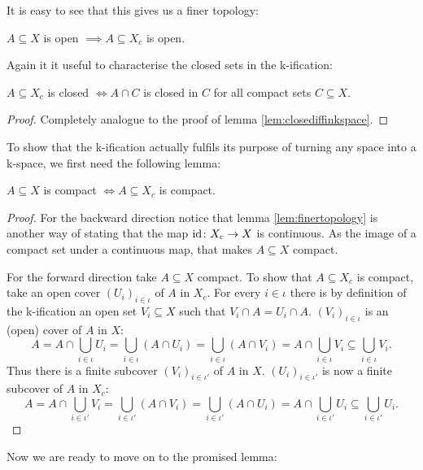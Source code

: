 It is easy to see that this gives us a finer topology: 

\begin{lem}\label{lem:finertopology}
    $A \subseteq X$ is open $\implies A \subseteq X_c$ is open.
\end{lem}

Again it it useful to characterise the closed sets in the k-ification: 

\begin{lem}
    $A \subseteq X_c$ is closed $\iff A \cap C$ is closed in $C$ for all compact sets $C \subseteq X$.
\end{lem}
\begin{proof}
    Completely analogue to the proof of lemma \ref{lem:closediffinkspace}.
\end{proof}

To show that the k-ification actually fulfils its purpose of turning any space into a k-space, we first need the following lemma:

\begin{lem}\label{lem:compactiffcompact}
    $A \subseteq X$ is compact $\iff A \subseteq X_c$ is compact.
\end{lem}
\begin{proof}
    For the backward direction notice that lemma \ref{lem:finertopology} is another way of stating that the map $\text{id} \colon X_c \to X$ is continuous. 
    As the image of a compact set under a continuous map, that makes $A \subseteq X$ compact. 

    For the forward direction take $A \subseteq X$ compact. 
    To show that $A \subseteq X_c$ is compact, take an open cover $(U_i)_{i \in \iota}$ of $A$ in $X_c$. 
    For every $i \in \iota$ there is by definition of the k-ification an open set $V_i \subseteq X$ such that $V_i \cap A = U_i \cap A$.  
    $(V_i)_{i \in \iota}$ is an (open) cover of $A$ in $X$: 
    \[A = A \cap \bigcup_{i \in \iota} U_i = \bigcup_{i \in \iota} (A \cap U_i) = \bigcup_{i \in \iota} (A \cap V_i) = A \cap \bigcup_{i \in \iota} V_i \subseteq \bigcup_{i \in \iota} V_i.\]
    Thus there is a finite subcover $(V_i)_{i \in \iota'}$ of $A$ in $X$.
    $(U_i)_{i \in \iota'}$ is now a finite subcover of $A$ in $X_c$: 
    \[A = A \cap \bigcup_{i \in \iota'} V_i = \bigcup_{i \in \iota'} (A \cap V_i) = \bigcup_{i \in \iota'} (A \cap U_i) = A \cap \bigcup_{i \in \iota'} U_i \subseteq \bigcup_{i \in \iota'} U_i.\]
\end{proof}

Now we are ready to move on to the promised lemma:

